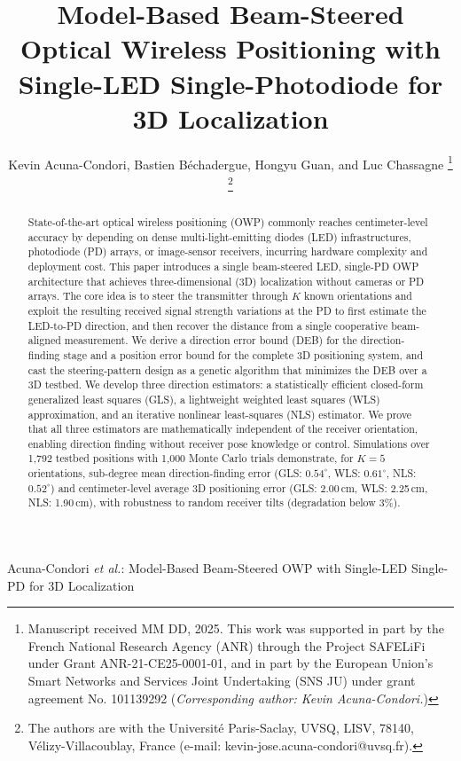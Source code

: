 \documentclass[journal]{IEEEtran}
\begin{document}

\title{Model-Based Beam-Steered Optical Wireless Positioning with Single-LED Single-Photodiode for 3D Localization}
\author{Kevin Acuna-Condori, Bastien Béchadergue, Hongyu Guan, and Luc Chassagne
\thanks{Manuscript received MM DD, 2025.
This work was supported in part by the French National Research Agency (ANR) through the Project SAFELiFi under Grant ANR-21-CE25-0001-01, and in part by the European Union's Smart Networks and Services Joint Undertaking (SNS JU) under grant agreement No. 101139292 (\textit{Corresponding author: Kevin Acuna-Condori.})
}
\thanks{
The authors are with the Université Paris-Saclay, UVSQ, LISV, 78140, Vélizy-Villacoublay, France (e-mail: kevin-jose.acuna-condori@uvsq.fr).
}
}
%
{Acuna-Condori \MakeLowercase{\textit{et al.}}: Model-Based Beam-Steered OWP with Single-LED Single-PD for 3D Localization}
\maketitle

\begin{abstract}
State-of-the-art optical wireless positioning (OWP) commonly reaches centimeter-level accuracy by depending on dense multi-light-emitting diodes (LED) infrastructures, photodiode (PD) arrays, or image-sensor receivers, incurring hardware complexity and deployment cost. 
This paper introduces a single beam-steered LED, single-PD OWP architecture that achieves three-dimensional (3D) localization without cameras or PD arrays. The core idea is to steer the transmitter through $K$ known orientations and exploit the resulting received signal strength variations at the PD to first estimate the LED-to-PD direction, and then recover the distance from a single cooperative beam-aligned measurement. We derive a direction error bound (DEB) for the direction-finding stage and a position error bound for the complete 3D positioning system, and cast the steering-pattern design as a genetic algorithm that minimizes the DEB over a 3D testbed. We develop three direction estimators: a statistically efficient closed-form generalized least squares (GLS), a lightweight weighted least squares (WLS) approximation, and an iterative nonlinear least-squares (NLS) estimator. We prove that all three estimators are mathematically independent of the receiver orientation, enabling direction finding without receiver pose knowledge or control. Simulations over 1,792 testbed positions with 1,000 Monte Carlo trials demonstrate, for $K=5$ orientations, sub-degree mean direction-finding error (GLS: $0.54^\circ$, WLS: $0.61^\circ$, NLS: $0.52^\circ$) and centimeter-level average 3D positioning error (GLS: 2.00\,cm, WLS: 2.25\,cm, NLS: 1.90\,cm), with robustness to random receiver tilts (degradation below 3\%).
\end{abstract}
\end{document}
